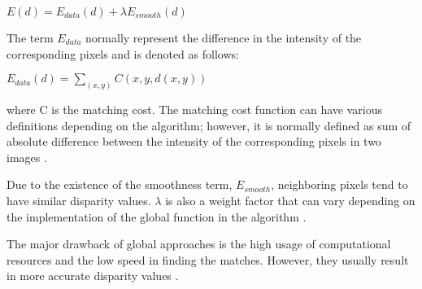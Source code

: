 \documentclass[dvips,letterpaper,12pt]{report}
\begin{document}
\begin{center}
$E(d)=E_{data}(d)+\lambda E_{smooth}(d)$
\end{center}
The term $E_{data}$ normally represent the difference in the intensity of the corresponding pixels and is denoted as follows:

\begin{center}
$E_{data}(d) = \sum_{(x,y)}C(x,y,d(x,y))$
\end{center}

where C is the matching cost. The matching cost function can have various definitions depending on the algorithm; however, it is normally defined as sum of absolute difference 
between the intensity of the corresponding pixels in two images \cite{sch02}.

Due to the existence of the smoothness term, $E_{smooth}$, neighboring pixels tend to have similar disparity values. $\lambda$ is also a weight factor that can vary depending 
on the implementation of the global function in the algorithm \cite{sze11}.


The major drawback of global approaches is the high usage of computational resources and the low speed in finding the matches. However, they usually result in more accurate disparity values
\cite{hirsch02,sze11}. 




 
\end{document}
